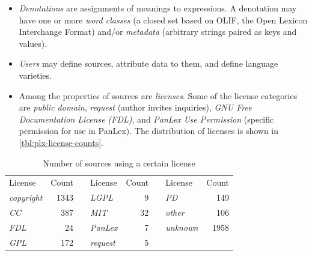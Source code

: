 \documentclass[sw]{iosart2c}
\begin{document}
\begin{itemize}
    \item \emph{Denotations} are assignments of meanings to expressions. A denotation may have one or more \emph{word classes} (a closed set based on OLIF, the Open Lexicon Interchange Format) and/or \emph{metadata} (arbitrary strings paired as keys and values).
  \item \emph{Users} may define sources, attribute data to them, and define language varieties.
  \item Among the properties of sources are \emph{licenses}. Some of the license categories are \emph{public domain},
\emph{request} (author invites inquiries),
\emph{GNU Free Documentation License (FDL)},
and \emph{PanLex Use Permission} (specific permission for use in PanLex).
    The distribution of licenses is shown in \autoref{tbl:plx-license-counts}.
\end{itemize}

\begin{table}
\centering
\begin{scriptsize}
\begin{tabular}{lrclrclr}
License          & Count &&
License          & Count &&
License          & Count \\
\cline{1-2} \cline{4-5} \cline{7-8}
\emph{copyright} &  1343  && \emph{LGPL}      &     9 && \emph{PD}           & 149 \\
\emph{CC}          &   387   && \emph{MIT}         &    32 && \emph{other}       &   106 \\
\emph{FDL}        &    24    && \emph{PanLex}    &    7 && \emph{unknown}  &  1958 \\
\emph{GPL}        &   172   && \emph{request}    &     5 \\
\end{tabular}
\end{scriptsize}
\caption{Number of sources using a certain license}
\label{tbl:plx-license-counts}
\end{table}
\end{document}
